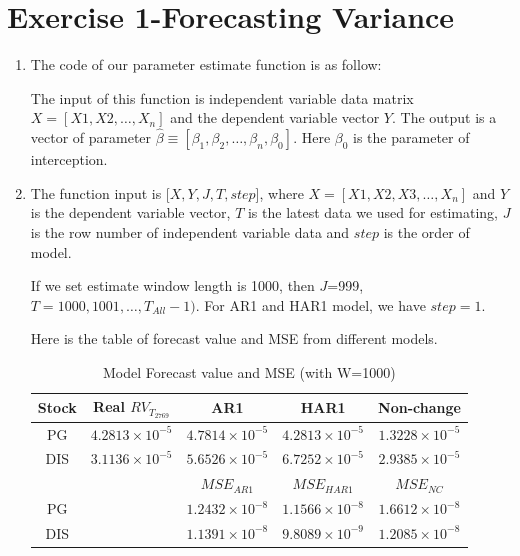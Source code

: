 \documentclass[12pt,letterpaper]{article}
\begin{document}
\section*{Exercise 1-Forecasting Variance}
  \begin{enumerate}[label=\textbf{(\Alph*)}]
\item 
The code of our parameter estimate function is as follow:

The input of this function is independent variable data matrix $X=[X1,X2,\dots, X_n]$ and the dependent variable vector $Y$. The output is a vector of parameter $\hat{\beta} \equiv [\beta_1,\beta_2,\dots,\beta_n,\beta_0]$. Here $\beta_0$ is the parameter of interception.
\item 
The function input is [$X,Y,J,T,step$], where $X=[X1,X2,X3,\dots, X_n]$ and $Y$ is the dependent variable vector, $T$ is the latest data we used for estimating, $J$ is the row number of independent variable data and $step$ is the order of model.

If we set estimate window length is 1000, then $J$=999, $T=1000,1001, \dots, T_{All}-1)$. For AR1 and HAR1 model, we have $step=1$.

Here is the table of forecast value and MSE from different models.

\begin{table}[ht]
	\footnotesize
	\caption{Model Forecast value and MSE (with W=1000)}
	\centering %
	\begin{tabular}{cc ccc} %
	
		\hline\hline %
		Stock& Real $RV_{T_{2769}}$ &AR1&HAR1&Non-change\\  %
		\hline %
		PG&$4.2813\times10^{-5}$&$4.7814\times10^{-5}$&$4.2813\times 10^{-5}$&$1.3228\times 10^{-5}$\\ 
		
	    DIS& $3.1136\times10^{-5}$&$5.6526\times 10^{-5}$&$6.7252\times 10^{-5}$&$2.9385\times 10^{-5}$\\  %
		\hline %
		\hline
		 & &$MSE_{AR1}$& $MSE_{HAR1}$& $MSE_{NC}$\\  %
		\cline{3-5} %
		PG& &$1.2432\times 10^{-8}$&$1.1566\times 10^{-8}$&$1.6612\times10^{-8}$\\ 
		
		DIS& &$1.1391\times 10^{-8}$&$9.8089\times 10^{-9}$&$1.2085\times 10^{-8}$\\  %
		\hline %
		

\end{tabular}
\end{table}
\end{enumerate}
\end{document}

